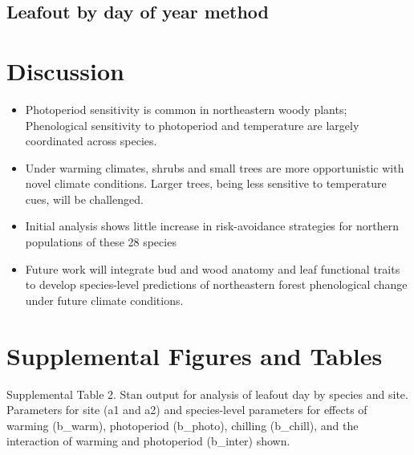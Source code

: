 \documentclass[11pt]{article}
\begin{document}
\subsection{Leafout by day of year method}


 

\section{Discussion}

\begin{itemize}

\item{Photoperiod sensitivity is common in northeastern woody plants; Phenological sensitivity to photoperiod and temperature are largely coordinated across species.}
\item{Under warming climates, shrubs and small trees are more opportunistic with novel climate conditions. Larger trees, being less sensitive to temperature cues, will be challenged. }
\item{Initial analysis shows little increase in risk-avoidance strategies for northern populations of these 28 species}
\item{Future work will integrate bud and wood anatomy and leaf functional traits to develop species-level predictions of northeastern forest phenological change under future climate conditions.}
\end{itemize}


\section{Supplemental Figures and Tables}


Supplemental Table 2. Stan output for analysis of leafout day by species and site. Parameters for site (a1 and a2) and species-level parameters for effects of warming (b_warm), photoperiod (b_photo), chilling (b_chill), and the interaction of warming and photoperiod (b_inter) shown.
\end{document}
